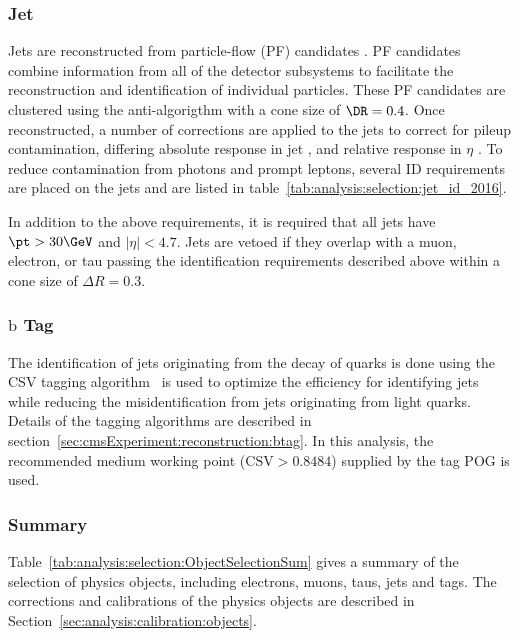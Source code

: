 \subsubsection{Jet}
Jets are reconstructed from particle-flow (PF) candidates \cite{ref:pf}. PF candidates combine information from all of the detector subsystems to facilitate the reconstruction and identification of individual particles.  These PF candidates are clustered using the anti-\kt algorigthm \cite{Cacciari:2008gp} with a cone size of $\DR = 0.4$. Once reconstructed, a number of corrections are applied to the jets to correct for pileup contamination, differing absolute response in jet \pt, and relative response in $\eta$ \cite{ref:jetscale}.  To reduce contamination from photons and prompt leptons, several ID requirements are placed on the jets and are listed in table~\ref{tab:analysis:selection:jet_id_2016}.



\noindent In addition to the above requirements, it is required that all jets have $\pt > 30\GeV$ and $|\eta| < 4.7$.  Jets are vetoed if they overlap with a muon, electron, or tau passing the identification requirements described above within a cone size of $\Delta R = 0.3$. 

\subsubsection{$\mathrm{b}$ Tag} The identification of jets originating from the decay of \PQb quarks is done using the CSV \PQb tagging algorithm~\cite{Sirunyan:2298594} is used to optimize the efficiency for identifying \PQb jets while reducing the misidentification from jets originating from light quarks. Details of the \PQb tagging algorithms are described in section~\ref{sec:cmsExperiment:reconstruction:btag}.  In this analysis, the recommended medium working point ($\text{CSV} > 0.8484$) supplied by the \PQb tag POG is used. 




\subsubsection{Summary}

Table~\ref{tab:analysis:selection:ObjectSelectionSum} gives a summary of the selection of physics objects, including electrons, muons, taus, jets and \PQb tags. The corrections and calibrations of the physics objects are described in Section~\ref{sec:analysis:calibration:objects}.


